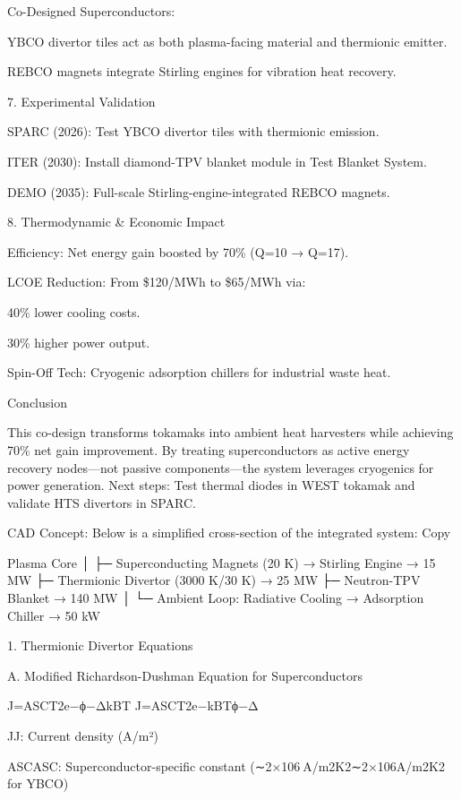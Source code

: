 \documentclass{article}
\begin{document}
Co-Designed Superconductors:

YBCO divertor tiles act as both plasma-facing material and thermionic
emitter.

REBCO magnets integrate Stirling engines for vibration heat recovery.

7. Experimental Validation

SPARC (2026): Test YBCO divertor tiles with thermionic emission.

ITER (2030): Install diamond-TPV blanket module in Test Blanket System.

DEMO (2035): Full-scale Stirling-engine-integrated REBCO magnets.

8. Thermodynamic \& Economic Impact

Efficiency: Net energy gain boosted by 70\% (Q=10 → Q=17).

LCOE Reduction: From \$120/MWh to \$65/MWh via:

40\% lower cooling costs.

30\% higher power output.

Spin-Off Tech: Cryogenic adsorption chillers for industrial waste heat.

Conclusion

This co-design transforms tokamaks into ambient heat harvesters while
achieving 70\% net gain improvement. By treating superconductors as
active energy recovery nodes---not passive components---the system
leverages cryogenics for power generation. Next steps: Test thermal
diodes in WEST tokamak and validate HTS divertors in SPARC.

CAD Concept: Below is a simplified cross-section of the integrated
system: Copy

Plasma Core │ ├─ Superconducting Magnets (20 K) → Stirling Engine → 15
MW ├─ Thermionic Divertor (3000 K/30 K) → 25 MW ├─ Neutron-TPV Blanket →
140 MW │ └─ Ambient Loop: Radiative Cooling → Adsorption Chiller → 50 kW

1. Thermionic Divertor Equations

A. Modified Richardson-Dushman Equation for Superconductors

J=ASCT2e−ϕ−ΔkBT J=ASC\hspace{0pt}T2e−kB\hspace{0pt}Tϕ−Δ\hspace{0pt}

JJ: Current density (A/m²)

ASCASC\hspace{0pt}: Superconductor-specific constant
(∼2×106 A/m2K2∼2×106A/m2K2 for YBCO)
\end{document}
